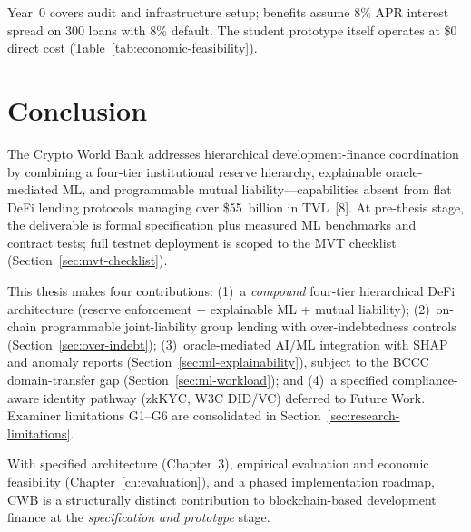 \documentclass[12pt,a4paper]{report}
\begin{document}
\noindent Year~0 covers audit and infrastructure setup; benefits assume 8\% APR interest spread on 300 loans with 8\% default. The student prototype itself operates at \$0 direct cost (Table~\ref{tab:economic-feasibility}).

\chapter{Conclusion}
\label{ch:conclusion}

The Crypto World Bank addresses hierarchical development-finance coordination by combining a four-tier institutional reserve hierarchy, explainable oracle-mediated ML, and programmable mutual liability---capabilities absent from flat DeFi lending protocols managing over \$55~billion in TVL~[8]. At pre-thesis stage, the deliverable is formal specification plus measured ML benchmarks and contract tests; full testnet deployment is scoped to the MVT checklist (Section~\ref{sec:mvt-checklist}).

\label{sec:research-contribution}
This thesis makes four contributions: (1)~a \textit{compound} four-tier hierarchical DeFi architecture (reserve enforcement + explainable ML + mutual liability); (2)~on-chain programmable joint-liability group lending with over-indebtedness controls (Section~\ref{sec:over-indebt}); (3)~oracle-mediated AI/ML integration with SHAP and anomaly reports (Section~\ref{sec:ml-explainability}), subject to the BCCC domain-transfer gap (Section~\ref{sec:ml-workload}); and (4)~a specified compliance-aware identity pathway (zkKYC, W3C DID/VC) deferred to Future Work. Examiner limitations G1--G6 are consolidated in Section~\ref{sec:research-limitations}.

With specified architecture (Chapter~3), empirical evaluation and economic feasibility (Chapter~\ref{ch:evaluation}), and a phased implementation roadmap, CWB is a structurally distinct contribution to blockchain-based development finance at the \textit{specification and prototype} stage.

\label{sec:future-work}
\end{document}
